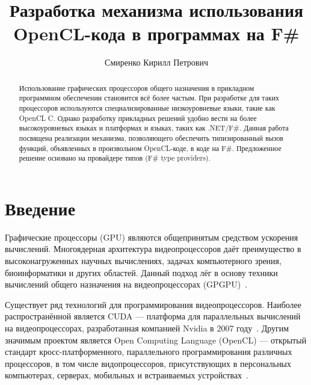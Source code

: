 \title{Разработка механизма использования OpenCL-кода в программах на F\#}


\author{Смиренко Кирилл Петрович}



\maketitle

  \begin{abstract}
    Использование графических процессоров общего назначения в прикладном программном обеспечении становится всё более частым. 
    При разработке для таких процессоров используются специализированные низкоуровневые языки, такие как OpenCL C.
    Однако разработку прикладных решений удобно вести на более высокоуровневых языках и платформах и языках, таких как .NET/F\#. 
    Данная работа посвящена реализации механизма, позволяющего обеспечить типизированный вызов функций, объявленных в произвольном OpenCL-коде, в коде на F\#. 
    Предложенное решение основано на провайдере типов (F\# type providers).
  \end{abstract}


\section*{Введение}
Графические процессоры (GPU) являются общепринятым средством ускорения вычислений. Многоядерная архитектура видеопроцессоров даёт преимущество в высоконагруженных научных вычислениях, задачах компьютерного зрения, биоинформатики и других областей. Данный подход лёг в основу техники вычислений общего назначения на видеопроцессорах (GPGPU)~\cite{CUDA_to_OpenCL, GPGPU_1}.

Существует ряд технологий для программирования видеопроцессоров. Наиболее распространённой является CUDA --- платформа для параллельных вычислений на видеопроцессорах, разработанная компанией Nvidia в 2007 году~\cite{CUDA}. Другим значимым проектом является Open Computing Language (OpenCL) --- открытый стандарт кросс-платформенного, параллельного программирования различных процессоров, в том числе видопроцессоров, присутствующих в персональных компьютерах, серверах, мобильных и встраиваемых устройствах~\cite{OpenCL}.

